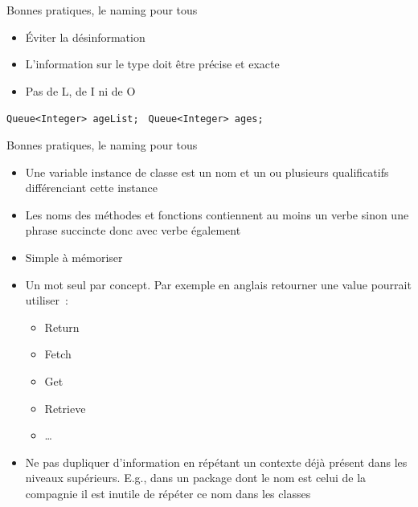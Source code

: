\documentclass{beamer}
\begin{document}
    \begin{frame}{Bonnes pratiques, le naming pour tous}

        \begin{itemize}

            \item Éviter la désinformation
            \item L'information sur le type doit être précise et exacte
            \item Pas de L, de I ni de O

        \end{itemize}
        \bigbreak

        \quad\texttt{Queue<Integer> ageList; }\quad{}
        \bigbreak
        \quad\texttt{Queue<Integer> ages; }\quad{}
    \end{frame}

    \begin{frame}{Bonnes pratiques, le naming pour tous}

        \begin{itemize}

            \item Une variable instance de classe est un nom et un ou plusieurs qualificatifs différenciant cette instance
            \item Les noms des méthodes et fonctions contiennent au moins un verbe sinon une phrase succincte donc avec verbe également
            \item Simple à mémoriser
            \item Un mot seul par concept.
            Par exemple en anglais retourner une value pourrait utiliser~:
            \begin{itemize}
                \item Return
                \item Fetch
                \item Get
                \item Retrieve
                \item …
            \end{itemize}
            \item Ne pas dupliquer d'information en répétant un contexte déjà présent dans les niveaux supérieurs.
            E.g., dans un package dont le nom est celui de la compagnie il est inutile de répéter ce nom dans les classes

        \end{itemize}
    \end{frame}
\end{document}
